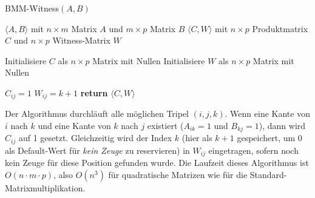 \documentclass{scrartcl}
\numberwithin{equation}{section}
\begin{document}
\begin{algorithm}
	\caption{BMM-Witness$(A, B)$}
	\label{alg:bmm_witness}
	\begin{algorithmic}[1]
		\Require $\langle A, B \rangle$ mit $n \times m$ Matrix $A$ und $m \times p$ Matrix $B$
		\Ensure $\langle C, W \rangle$ mit $n \times p$ Produktmatrix $C$ und $n \times p$ Witness-Matrix $W$
		
		\State Initialisiere $C$ als $n \times p$ Matrix mit Nullen
		\State Initialisiere $W$ als $n \times p$ Matrix mit Nullen
		
		\State $C_{ij} = 1$
		 
		\State $W_{ij} = k+1$ 
		\EndIf
		\EndIf
		\EndFor
		\EndFor
		\EndFor
		\State \textbf{return} $\langle C, W \rangle$
	\end{algorithmic}
\end{algorithm}

Der Algorithmus durchläuft alle möglichen Tripel $(i, j, k)$. Wenn eine Kante von $i$ nach $k$ und eine Kante von $k$ nach $j$ existiert ($A_{ik}=1$ und $B_{kj}=1$), dann wird $C_{ij}$ auf 1 gesetzt. Gleichzeitig wird der Index $k$ (hier als $k+1$ gespeichert, um 0 als Default-Wert für \textit{kein Zeuge} zu reservieren) in $W_{ij}$ eingetragen, sofern noch kein Zeuge für diese Position gefunden wurde. Die Laufzeit dieses Algorithmus ist $O(n \cdot m \cdot p)$, also $O(n^3)$ für quadratische Matrizen wie für die Standard-Matrixmultiplikation.

\end{document}
